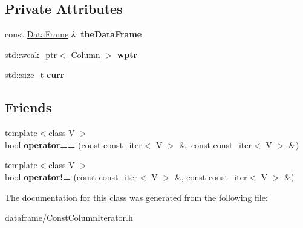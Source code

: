 \subsection*{Private Attributes}
\begin{DoxyCompactItemize}
\item 
\mbox{\label{classDataFrame_1_1ConstColumnIterator_a9f8b079e45b708072aa9eec8ff4c7b98}} 
const \hyperlink{classDataFrame}{Data\+Frame} \& {\bfseries the\+Data\+Frame}
\item 
\mbox{\label{classDataFrame_1_1ConstColumnIterator_ae4a28de973f2e243ca9a0f0b0523d95a}} 
std\+::weak\+\_\+ptr$<$ \hyperlink{classColumn}{Column} $>$ {\bfseries wptr}
\item 
\mbox{\label{classDataFrame_1_1ConstColumnIterator_a50d3d59e14b5ca2d4f2982d799f0100d}} 
std\+::size\+\_\+t {\bfseries curr}
\end{DoxyCompactItemize}
\subsection*{Friends}
\begin{DoxyCompactItemize}
\item 
\mbox{\label{classDataFrame_1_1ConstColumnIterator_a296e4ef4f1f9cf5dcc7b37059c80176f}} 
{\footnotesize template$<$class V $>$ }\\bool {\bfseries operator==} (const const\+\_\+iter$<$ V $>$ \&, const const\+\_\+iter$<$ V $>$ \&)
\item 
\mbox{\label{classDataFrame_1_1ConstColumnIterator_aeb3fca876f6e8343e6a0fa8ec2532fe2}} 
{\footnotesize template$<$class V $>$ }\\bool {\bfseries operator!=} (const const\+\_\+iter$<$ V $>$ \&, const const\+\_\+iter$<$ V $>$ \&)
\end{DoxyCompactItemize}


The documentation for this class was generated from the following file\+:\begin{DoxyCompactItemize}
\item 
dataframe/Const\+Column\+Iterator.\+h\end{DoxyCompactItemize}
